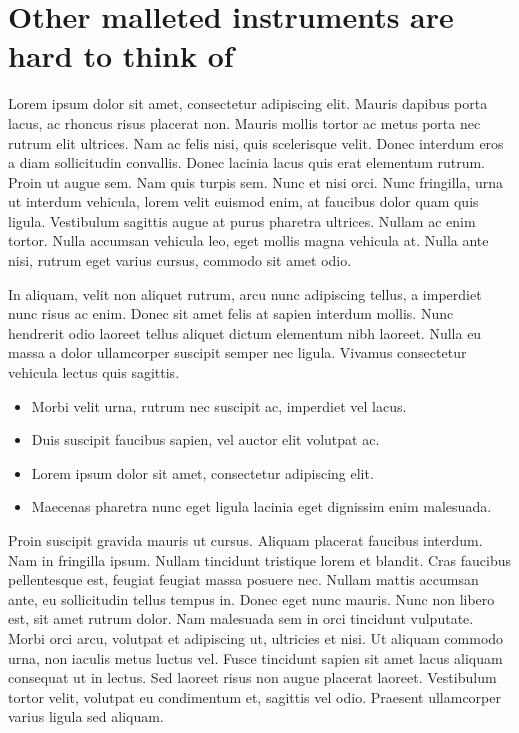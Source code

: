\documentclass[11pt,oneside,openany]{book}
\begin{document}
\chapter{Other malleted instruments are hard to think of}\hypertarget{other-malleted-instruments-are-hard-to-think-of}{}\label{other-malleted-instruments-are-hard-to-think-of}

Lorem ipsum dolor sit amet, consectetur adipiscing elit. Mauris dapibus porta lacus, ac rhoncus risus placerat non. Mauris mollis tortor ac metus porta nec rutrum elit ultrices. Nam ac felis nisi, quis scelerisque velit. Donec interdum eros a diam sollicitudin convallis. Donec lacinia lacus quis erat elementum rutrum. Proin ut augue sem. Nam quis turpis sem. Nunc et nisi orci. Nunc fringilla, urna ut interdum vehicula, lorem velit euismod enim, at faucibus dolor quam quis ligula. Vestibulum sagittis augue at purus pharetra ultrices. Nullam ac enim tortor. Nulla accumsan vehicula leo, eget mollis magna vehicula at. Nulla ante nisi, rutrum eget varius cursus, commodo sit amet odio.

In aliquam, velit non aliquet rutrum, arcu nunc adipiscing tellus, a imperdiet nunc risus ac enim. Donec sit amet felis at sapien interdum mollis. Nunc hendrerit odio laoreet tellus aliquet dictum elementum nibh laoreet. Nulla eu massa a dolor ullamcorper suscipit semper nec ligula. Vivamus consectetur vehicula lectus quis sagittis.

\begin{itemize}
\item Morbi velit urna, rutrum nec suscipit ac, imperdiet vel lacus.
\item Duis suscipit faucibus sapien, vel auctor elit volutpat ac.
\item Lorem ipsum dolor sit amet, consectetur adipiscing elit.
\item Maecenas pharetra nunc eget ligula lacinia eget dignissim enim malesuada.
\end{itemize}

Proin suscipit gravida mauris ut cursus. Aliquam placerat faucibus interdum. Nam in fringilla ipsum. Nullam tincidunt tristique lorem et blandit. Cras faucibus pellentesque est, feugiat feugiat massa posuere nec. Nullam mattis accumsan ante, eu sollicitudin tellus tempus in. Donec eget nunc mauris. Nunc non libero est, sit amet rutrum dolor. Nam malesuada sem in orci tincidunt vulputate. Morbi orci arcu, volutpat et adipiscing ut, ultricies et nisi. Ut aliquam commodo urna, non iaculis metus luctus vel. Fusce tincidunt sapien sit amet lacus aliquam consequat ut in lectus. Sed laoreet risus non augue placerat laoreet. Vestibulum tortor velit, volutpat eu condimentum et, sagittis vel odio. Praesent ullamcorper varius ligula sed aliquam.	
\end{document}
